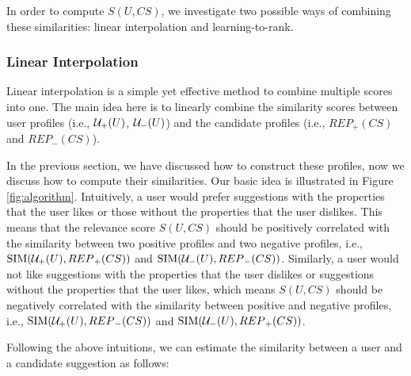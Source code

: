 In order to compute $S(U,CS)$, we investigate two 
possible ways of combining these similarities: 
linear interpolation and learning-to-rank. 


\subsubsection{Linear Interpolation} 
\label{sec:linear_interpolation}


Linear interpolation is a simple yet 
effective method to combine multiple scores 
into one.  
The main idea here is to linearly 
combine the similarity scores between user profiles 
(i.e., ${\cal U}_{+}(U)$, ${\cal U}_{-}(U)$) and the 
candidate profiles 
(i.e., ${REP}_{+}(CS)$ and ${REP}_{-}(CS)$). 


In the previous section, we have discussed how to construct these profiles, 
now we discuss how to compute their similarities. Our basic idea is illustrated
in Figure \ref{fig:algorithm}. Intuitively, a user would prefer 
suggestions with the properties that the user likes or those without 
the properties that the user dislikes. This means that the relevance 
score $S(U,CS)$ should be positively correlated with the similarity 
between two positive profiles and two negative profiles, i.e., 
$\mathrm{SIM}({\cal U}_{+}(U),{REP}_{+}(CS))$ 
and $\mathrm{SIM}({\cal U}_{-}(U),{REP}_{-}(CS))$. Similarly, a user would not 
like suggestions with the properties that the user dislikes or 
suggestions without the properties that the user likes, which means 
$S(U,CS)$ should be negatively correlated with the similarity between 
positive and negative profiles, i.e., $\mathrm{SIM}({\cal U}_{+}(U),{REP}_{-}(CS))$ 
and $\mathrm{SIM}({\cal U}_{-}(U),{REP}_{+}(CS))$. 


Following the above intuitions, we can estimate the similarity between a user and a candidate suggestion as follows: 

